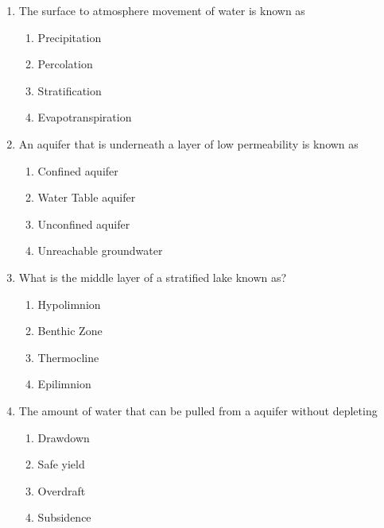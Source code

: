 \documentclass{article}
\begin{document}
\begin{enumerate}
\item  The surface to atmosphere movement of water is known as\\
\begin{enumerate}
\item Precipitation\\
\item Percolation\\
\item Stratification\\
\item Evapotranspiration
\end{enumerate}

\item  An aquifer that is underneath a layer of low permeability is known as\\
\begin{enumerate}
\item Confined aquifer\\
\item Water Table aquifer\\
\item Unconfined aquifer\\
\item Unreachable groundwater
\end{enumerate}

\item  What is the middle layer of a stratified lake known as?\\
\begin{enumerate}
\item Hypolimnion\\
\item Benthic Zone\\
\item Thermocline\\
\item Epilimnion
\end{enumerate}

\item  The amount of water that can be pulled from a aquifer without depleting\\
\begin{enumerate}
\item Drawdown\\
\item Safe yield\\
\item Overdraft\\
\item Subsidence
\end{enumerate}


\end{enumerate}
\end{document}

